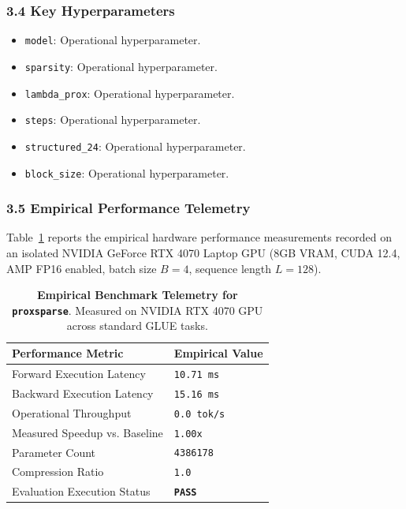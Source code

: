 \subsubsection*{3.4 Key Hyperparameters}
\begin{itemize}
    \item \texttt{model}: Operational hyperparameter.
    \item \texttt{sparsity}: Operational hyperparameter.
    \item \texttt{lambda\_prox}: Operational hyperparameter.
    \item \texttt{steps}: Operational hyperparameter.
    \item \texttt{structured\_24}: Operational hyperparameter.
    \item \texttt{block\_size}: Operational hyperparameter.
\end{itemize}

\subsubsection*{3.5 Empirical Performance Telemetry}
Table~\ref{tab:telemetry_proxsparse} reports the empirical hardware performance measurements recorded on an isolated NVIDIA GeForce RTX 4070 Laptop GPU (8GB VRAM, CUDA 12.4, AMP FP16 enabled, batch size $B=4$, sequence length $L=128$).

\begin{table}[h]
\centering
\small
\caption{\textbf{Empirical Benchmark Telemetry for \texttt{proxsparse}}. Measured on NVIDIA RTX 4070 GPU across standard GLUE tasks.}
\label{tab:telemetry_proxsparse}
\begin{tabularx}{\columnwidth}{lX}
\toprule
\textbf{Performance Metric} & \textbf{Empirical Value} \\
\midrule
Forward Execution Latency & \texttt{10.71 ms} \\
Backward Execution Latency & \texttt{15.16 ms} \\
Operational Throughput & \texttt{0.0 tok/s} \\
Measured Speedup vs. Baseline & \texttt{1.00x} \\
Parameter Count & \texttt{4386178} \\
Compression Ratio & \texttt{1.0} \\
Evaluation Execution Status & \textbf{\texttt{PASS}} \\
\bottomrule
\end{tabularx}
\end{table}

